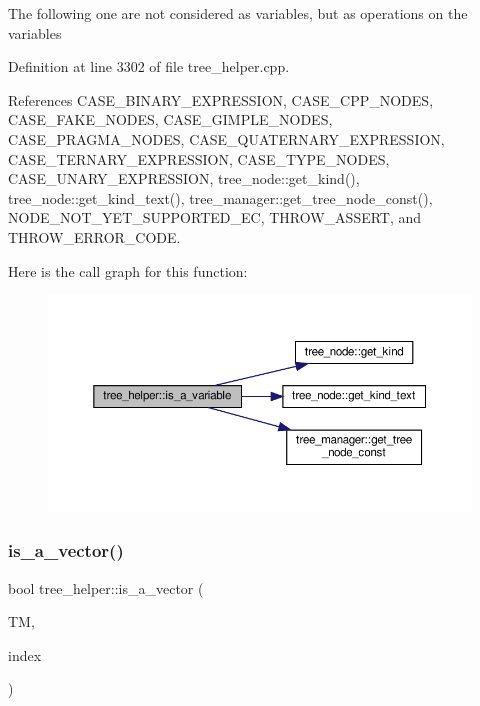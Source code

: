 The following one are not considered as variables, but as operations on the variables 

Definition at line 3302 of file tree\+\_\+helper.\+cpp.



References C\+A\+S\+E\+\_\+\+B\+I\+N\+A\+R\+Y\+\_\+\+E\+X\+P\+R\+E\+S\+S\+I\+ON, C\+A\+S\+E\+\_\+\+C\+P\+P\+\_\+\+N\+O\+D\+ES, C\+A\+S\+E\+\_\+\+F\+A\+K\+E\+\_\+\+N\+O\+D\+ES, C\+A\+S\+E\+\_\+\+G\+I\+M\+P\+L\+E\+\_\+\+N\+O\+D\+ES, C\+A\+S\+E\+\_\+\+P\+R\+A\+G\+M\+A\+\_\+\+N\+O\+D\+ES, C\+A\+S\+E\+\_\+\+Q\+U\+A\+T\+E\+R\+N\+A\+R\+Y\+\_\+\+E\+X\+P\+R\+E\+S\+S\+I\+ON, C\+A\+S\+E\+\_\+\+T\+E\+R\+N\+A\+R\+Y\+\_\+\+E\+X\+P\+R\+E\+S\+S\+I\+ON, C\+A\+S\+E\+\_\+\+T\+Y\+P\+E\+\_\+\+N\+O\+D\+ES, C\+A\+S\+E\+\_\+\+U\+N\+A\+R\+Y\+\_\+\+E\+X\+P\+R\+E\+S\+S\+I\+ON, tree\+\_\+node\+::get\+\_\+kind(), tree\+\_\+node\+::get\+\_\+kind\+\_\+text(), tree\+\_\+manager\+::get\+\_\+tree\+\_\+node\+\_\+const(), N\+O\+D\+E\+\_\+\+N\+O\+T\+\_\+\+Y\+E\+T\+\_\+\+S\+U\+P\+P\+O\+R\+T\+E\+D\+\_\+\+EC, T\+H\+R\+O\+W\+\_\+\+A\+S\+S\+E\+RT, and T\+H\+R\+O\+W\+\_\+\+E\+R\+R\+O\+R\+\_\+\+C\+O\+DE.

Here is the call graph for this function\+:
\nopagebreak
\begin{figure}[H]
\begin{center}
\leavevmode
\includegraphics[width=350pt]{d7/d99/classtree__helper_a4d6b6fc3da723a3aad8b884f9dd7ad9d_cgraph}
\end{center}
\end{figure}
\mbox{\label{classtree__helper_ac4d19443208195cc70181f00f9f0d40e}} 
\subsubsection{\texorpdfstring{is\+\_\+a\+\_\+vector()}{is\_a\_vector()}}
{\footnotesize\ttfamily bool tree\+\_\+helper\+::is\+\_\+a\+\_\+vector (\begin{DoxyParamCaption}\item[{const \hyperlink{tree__manager_8hpp_a792e3f1f892d7d997a8d8a4a12e39346}{tree\+\_\+manager\+Const\+Ref} \&}]{TM,  }\item[{const unsigned int}]{index }\end{DoxyParamCaption})\hspace{0.3cm}{\ttfamily [static]}}



